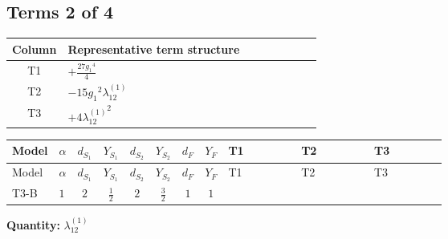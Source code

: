 \documentclass[8pt]{article}
\begin{document}
\begin{landscape}
\subsection*{Terms 2 of 4}
\begin{center}
\begin{tabular}{@{}c >{\raggedright\arraybackslash}p{0.82\linewidth}@{}}
\toprule
Column & Representative term structure \\
\midrule
T1 & \(\displaystyle +\frac{27 {g_1}^4}{4}\) \\
\midrule
T2 & \(\displaystyle -15 {g_1}^2 {\lambda_{12}^{(1)}}\) \\
\midrule
T3 & \(\displaystyle +4 {\lambda_{12}^{(1)}}^2\) \\
\midrule
\bottomrule
\end{tabular}
\end{center}
\smallskip
\tiny
\begin{longtable}{@{}llcccccc >{\raggedright\arraybackslash}p{0.21\linewidth} >{\raggedright\arraybackslash}p{0.21\linewidth} >{\raggedright\arraybackslash}p{0.21\linewidth}@{}}
\toprule
Model & $\alpha$ & $d_{S_1}$ & $Y_{S_1}$ & $d_{S_2}$ & $Y_{S_2}$ & $d_F$ & $Y_F$ & T1 & T2 & T3 \\
\midrule
\endfirsthead
\toprule
Model & $\alpha$ & $d_{S_1}$ & $Y_{S_1}$ & $d_{S_2}$ & $Y_{S_2}$ & $d_F$ & $Y_F$ & T1 & T2 & T3 \\
\midrule
\endhead
T3-B & $1$ & $2$ & $\frac{1}{2}$ & $2$ & $\frac{3}{2}$ & $1$ & $1$ & \scriptsize\adjustbox{max width=\linewidth}{$\begin{gathered} +\frac{27 {g_1}^4}{4}\end{gathered}$} & \scriptsize\adjustbox{max width=\linewidth}{$\begin{gathered} -15 {g_1}^2 {\lambda_{12}^{(1)}}\end{gathered}$} & \scriptsize\adjustbox{max width=\linewidth}{$\begin{gathered} +4 {\lambda_{12}^{(1)}}^2\end{gathered}$} \\
\midrule
\bottomrule
\end{longtable}
\clearpage
\noindent\textbf{Quantity: }$\lambda_{12}^{(1)}$\par\smallskip

\end{landscape}
\end{document}
